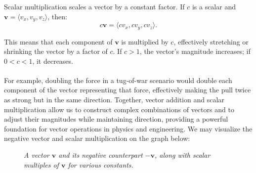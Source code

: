 \noindent Scalar multiplication scales a vector by a constant factor. If \( c \) is a scalar and \( \mathbf{v} = \langle v_x, v_y, v_z \rangle \), then:
\[
c\mathbf{v} = \langle c v_x, c v_y, c v_z \rangle.
\]

\noindent This means that each component of \( \mathbf{v} \) is multiplied by \( c \), effectively stretching or shrinking the vector by a factor of \( c \). If \( c > 1 \), the vector’s magnitude increases; if \( 0 < c < 1 \), it decreases. \\ \\ For example, doubling the force in a tug-of-war scenario would double each component of the vector representing that force, effectively making the pull twice as strong but in the same direction. Together, vector addition and scalar multiplication allow us to construct complex combinations of vectors and to adjust their magnitudes while maintaining direction, providing a powerful foundation for vector operations in physics and engineering. We may visualize the negative vector and scalar multiplication on the graph below:

\begin{figure}[H]
    \centering
    \caption{\textit{A vector \( \mathbf{v} \) and its negative counterpart \( -\mathbf{v} \), along with scalar multiples of \( \mathbf{v} \) for various constants.}}
    \label{fig:vector_scalar_multiplication}
\end{figure}

